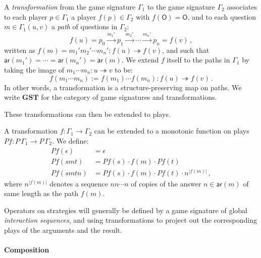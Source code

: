 \documentclass[sigplan,screen]{acmart}
\newcommand{\kw}[1]{\ensuremath{ \mathsf{#1} }}
\begin{document}
\begin{definition}
A \emph{transformation}
from the game signature $\Gamma_1$
to the game signature $\Gamma_2$
associates to each player $p \in \Gamma_1$ a player $f(p) \in \Gamma_2$
with $f(\kw{O}) = \kw{O}$,
and to each question $m \in \Gamma_1(u,v)$
a \emph{path} of questions in $\Gamma_2$:
\[
  f(u) = p_0 \xrightarrow{m_1'} p_1 \xrightarrow{m_2'} \cdots
             \xrightarrow{m_n'} p_n = f(v) \,,
\]
written as
$f(m) = m_1' m_2' \cdots m_n' : f(u) \twoheadrightarrow f(v)$, and
such that
$\kw{ar}(m_1') = \cdots = \kw{ar}(m_n') = \kw{ar}(m)$.
We extend $f$ itself to the paths in $\Gamma_1$
by taking the image of $m_1 \cdots m_n : u \twoheadrightarrow v$
to be:
\[
  f(m_1 \cdots m_n) := f(m_1) \cdots f(m_n) :
    f(u) \twoheadrightarrow f(v) \,.
\]
In other words,
a transformation
is a structure-preserving map on paths.
We write $\mathbf{GST}$ for the category of
game signatures and transformations.
\end{definition}

These transformations can then be extended to plays.

\begin{definition}
A transformation
$f : \Gamma_1 \rightarrow \Gamma_2$
can be extended to a monotonic function on plays
$P f  : P \, {\Gamma}_1 \rightarrow P \, {\Gamma}_2$.
We define:
\begin{align*}
  P f (\epsilon) &= \epsilon \\
  P f (smt) &= P f (s) \cdot f(m) \cdot P f (t) \\
  P f (smtn) &= P f (s) \cdot f(m) \cdot P f (t) \cdot n^{|f(m)|} \,,
\end{align*}
where $n^{|f(m)|}$ denotes a sequence $nn \cdots n$
of copies of the answer $n \in \kw{ar}(m)$
of same length as the path $f(m)$.
\end{definition}

Operators on strategies will generally be defined
by a game signature of global \emph{interaction sequences},
and using transformations to project out
the corresponding plays of the arguments and the result.

\paragraph{Composition} %
\end{document}
